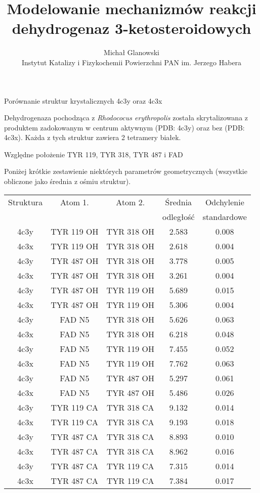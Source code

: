 \documentclass[10pt,a4paper]{article}
\title{Modelowanie mechanizmów reakcji dehydrogenaz 3-ketosteroidowych}
\author{Michał Glanowski\\ Instytut Katalizy i Fizykochemii Powierzchni PAN im. Jerzego Habera}
\begin{document}
\maketitle
\tableofcontents

\begin{section} {Porównanie struktur krystalicznych 4c3y oraz 4c3x}

Dehydrogenaza pochodząca z \textit{Rhodococus erythropolis} została skrytalizowana z produktem zadokowanym w centrum aktywnym (PDB: 4c3y)
oraz bez (PDB: 4c3x). Każda z tych struktur zawiera 2 tetramery 
białek. 

\begin{subsection} {Względne położenie TYR 119, TYR 318, TYR 487 i FAD}

Poniżej krótkie zestawienie niektórych parametrów geometrycznych (wszystkie obliczone jako średnia z ośmiu struktur).

 \begin{tabular}{||c c c c c||} 
 \hline
 Struktura & Atom 1. & Atom 2. & Średnia  & Odchylenie  \\  
           &         &         & odległość & standardowe \\ [0.5ex]
 \hline\hline
4c3y & TYR 119 OH &  TYR 318 OH & 2.583 &0.008\\
4c3x & TYR 119 OH  & TYR 318 OH &  2.618 &0.004\\
4c3y & TYR 487 OH  & TYR 318 OH & 3.778 &0.005\\
4c3x & TYR 487 OH  & TYR 318 OH  & 3.261 &0.004\\
4c3y & TYR 487 OH  & TYR 119 OH & 5.689 &0.015\\
4c3x & TYR 487 OH  & TYR 119 OH  & 5.306 &0.004\\
4c3y & FAD N5 &  TYR 318 OH & 5.626 &0.063\\
4c3x & FAD N5 &  TYR 318 OH &  6.218 &0.048\\
4c3y & FAD N5 &  TYR 119 OH & 7.455 &0.052\\
4c3x & FAD N5 &  TYR 119 OH &  7.762 &0.063\\
4c3y & FAD N5 &  TYR 487 OH & 5.297 &0.061\\
4c3x & FAD N5 &  TYR 487 OH &   5.486 &0.026\\
4c3y & TYR 119 CA &  TYR 318 CA & 9.132 & 0.014\\
4c3x & TYR 119 CA &  TYR 318 CA  & 9.193 & 0.018\\
4c3y & TYR 487 CA &  TYR 318 CA & 8.893 & 0.010\\
4c3x & TYR 487 CA &  TYR 318 CA  & 8.962 & 0.016\\
4c3y & TYR 487 CA &  TYR 119 CA & 7.315 & 0.014\\
4c3x & TYR 487 CA &  TYR 119 CA  & 7.384 & 0.017\\
 \hline
 

\end{tabular}
\end{subsection}
\end{section}
\end{document}
